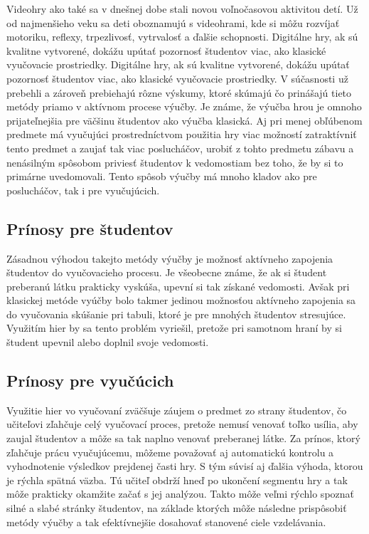 \documentclass[10pt,twoside,slovak,a4paper]{article}
\begin{document}
Videohry ako také sa v dnešnej dobe stali novou voľnočasovou aktivitou detí. Už od najmenšieho veku sa deti oboznamujú s videohrami, kde si môžu rozvíjať motoriku, reflexy, trpezlivosť, vytrvalosť a ďalšie schopnosti\cite{Chen2012-ao}. Digitálne hry, ak sú kvalitne vytvorené, dokážu upútať pozornosť študentov viac, ako klasické vyučovacie prostriedky. Digitálne hry, ak sú kvalitne vytvorené, dokážu upútať pozornosť študentov viac, ako klasické vyučovacie prostriedky. V súčasnosti už prebehli a zároveň prebiehajú rôzne výskumy, ktoré skúmajú čo prinášajú tieto metódy priamo v aktívnom procese výučby. Je známe, že výučba hrou je omnoho prijateľnejšia pre väčšinu študentov ako výučba klasická. Aj pri menej obľúbenom predmete má vyučujúci prostredníctvom použitia hry viac možností zatraktívniť tento predmet a zaujať tak viac poslucháčov, urobiť z tohto predmetu zábavu a nenásilným spôsobom priviesť študentov k vedomostiam bez toho, že by si to primárne uvedomovali. Tento spôsob výučby má mnoho kladov ako pre poslucháčov, tak i pre vyučujúcich.

\subsection{Prínosy pre študentov} \label{vyhody:studenti}

Zásadnou výhodou takejto metódy výučby je možnosť aktívneho zapojenia študentov do vyučovacieho procesu. Je všeobecne známe, že ak si študent preberanú látku prakticky vyskúša, upevní si tak získané vedomosti. Avšak pri klasickej metóde vyúčby bolo takmer jedinou možnosťou aktívneho zapojenia sa do vyučovania skúšanie pri tabuli, ktoré je pre mnohých študentov stresujúce. Využitím hier by sa tento problém vyriešil, pretože pri samotnom hraní by si študent upevnil alebo doplnil svoje vedomosti.

\subsection{Prínosy pre vyučúcich} \label{vyhody:vyucujuci}

Využitie hier vo vyučovaní zväčšuje záujem o predmet zo strany študentov\cite{Ucenie}, čo učiteľovi zľahčuje celý vyučovací proces, pretože nemusí venovať toľko usília, aby zaujal študentov a môže sa tak naplno venovať preberanej látke. Za prínos, ktorý zľahčuje prácu vyučujúcemu, môžeme považovať aj automatickú kontrolu a vyhodnotenie výsledkov prejdenej časti hry. S tým súvisí aj ďalšia výhoda, ktorou je rýchla spätná väzba. Tú učiteľ obdrží hneď po ukončení segmentu hry a tak môže prakticky okamžite začať s jej analýzou. Takto môže veľmi rýchlo spoznať silné a slabé stránky študentov, na základe ktorých môže následne prispôsobiť metódy výučby a tak efektívnejšie dosahovať stanovené ciele vzdelávania.
\end{document}
